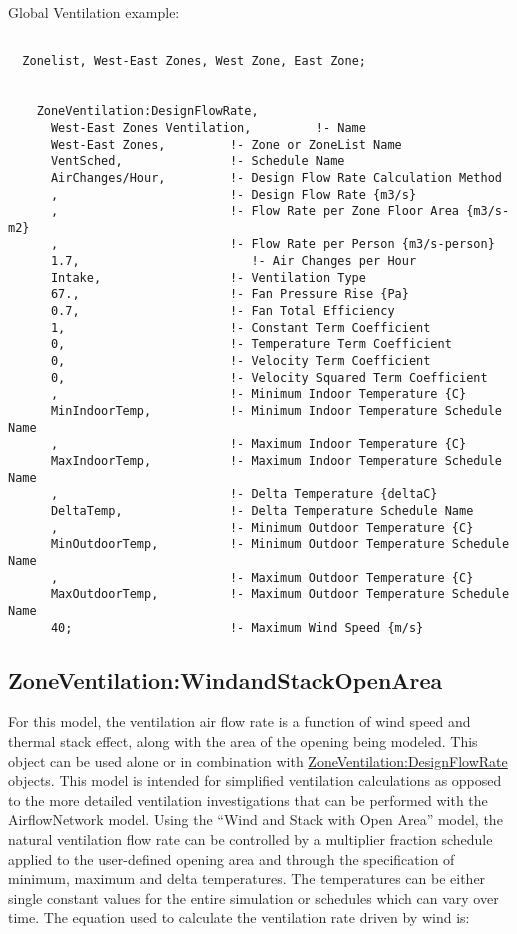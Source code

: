 Global Ventilation example:

\begin{lstlisting}

  Zonelist, West-East Zones, West Zone, East Zone;


    ZoneVentilation:DesignFlowRate,
      West-East Zones Ventilation,         !- Name
      West-East Zones,         !- Zone or ZoneList Name
      VentSched,               !- Schedule Name
      AirChanges/Hour,         !- Design Flow Rate Calculation Method
      ,                        !- Design Flow Rate {m3/s}
      ,                        !- Flow Rate per Zone Floor Area {m3/s-m2}
      ,                        !- Flow Rate per Person {m3/s-person}
      1.7,                        !- Air Changes per Hour
      Intake,                  !- Ventilation Type
      67.,                     !- Fan Pressure Rise {Pa}
      0.7,                     !- Fan Total Efficiency
      1,                       !- Constant Term Coefficient
      0,                       !- Temperature Term Coefficient
      0,                       !- Velocity Term Coefficient
      0,                       !- Velocity Squared Term Coefficient
      ,                        !- Minimum Indoor Temperature {C}
      MinIndoorTemp,           !- Minimum Indoor Temperature Schedule Name
      ,                        !- Maximum Indoor Temperature {C}
      MaxIndoorTemp,           !- Maximum Indoor Temperature Schedule Name
      ,                        !- Delta Temperature {deltaC}
      DeltaTemp,               !- Delta Temperature Schedule Name
      ,                        !- Minimum Outdoor Temperature {C}
      MinOutdoorTemp,          !- Minimum Outdoor Temperature Schedule Name
      ,                        !- Maximum Outdoor Temperature {C}
      MaxOutdoorTemp,          !- Maximum Outdoor Temperature Schedule Name
      40;                      !- Maximum Wind Speed {m/s}
\end{lstlisting}

\subsection{ZoneVentilation:WindandStackOpenArea}\label{zoneventilationwindandstackopenarea}

For this model, the ventilation air flow rate is a function of wind speed and thermal stack effect, along with the area of the opening being modeled. This object can be used alone or in combination with \hyperref[zoneventilationdesignflowrate]{ZoneVentilation:DesignFlowRate} objects. This model is intended for simplified ventilation calculations as opposed to the more detailed ventilation investigations that can be performed with the AirflowNetwork model. Using the ``Wind and Stack with Open Area'' model, the natural ventilation flow rate can be controlled by a multiplier fraction schedule applied to the user-defined opening area and through the specification of minimum, maximum and delta temperatures. The temperatures can be either single constant values for the entire simulation or schedules which can vary over time. The equation used to calculate the ventilation rate driven by wind is:

